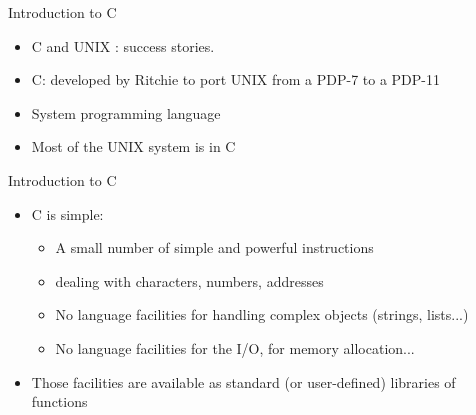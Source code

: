 
\begin{frame}[fragile]{Introduction to C}
\begin{itemize}
\item C and UNIX : success stories.
\item C: developed by Ritchie to port UNIX from a PDP-7 to a PDP-11
\item System programming language
\item Most of the UNIX system is in C
\end{itemize}

\end{frame}
\begin{frame}[fragile]{Introduction to C}
\begin{itemize}
\item C is simple:
  \begin{itemize}
  \item A small number of simple and powerful instructions
  \item dealing with characters, numbers, addresses
  \item No language facilities for handling complex objects
        (strings, lists...)
  \item No language facilities for the I/O, for memory allocation...
  \end{itemize}
\item Those facilities are available as standard (or user-defined)
      libraries of functions
\end{itemize}
\end{frame}

